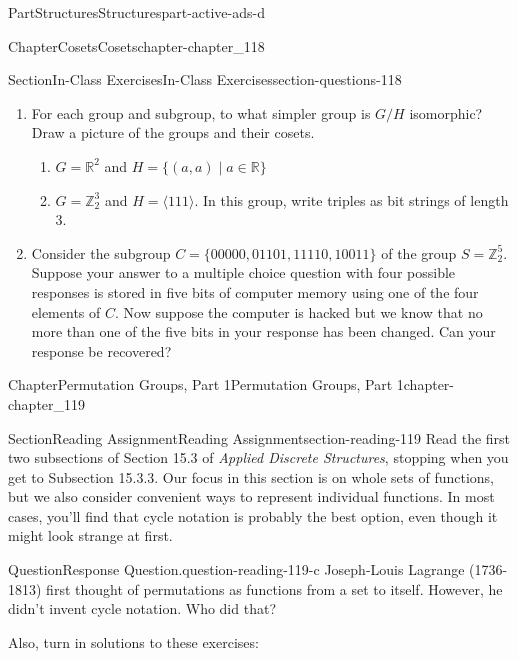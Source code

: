 \documentclass[oneside,10pt,]{book}
\numberwithin{equation}{section}
\begin{document}
\begin{partptx}{Part}{Structures}{}{Structures}{}{}{part-active-ads-d}
\begin{chapterptx}{Chapter}{Cosets}{}{Cosets}{}{}{chapter-chapter_118}
\begin{sectionptx}{Section}{In-Class Exercises}{}{In-Class Exercises}{}{}{section-questions-118}
\begin{enumerate}[label=\arabic*.]
\item{}For each group and subgroup, to what simpler group is  \(G/H\) isomorphic?  Draw a picture of the groups and their cosets.%
\begin{enumerate}[label=(\alph*)]
\item{}\(G= \mathbb{R}^2\)  and  \(H = \{(a,a) \mid a\in\mathbb{R}\}\)%
\item{}\(G = \mathbb{Z}_2^3\)  and  \(H = \langle 111 \rangle\).  In this group, write triples as bit strings of length 3.%
\end{enumerate}
%
\item{}Consider the subgroup \(C = \{00000, 01101, 11110, 10011\}\) of the group \(S=\mathbb{Z}_2^5\). Suppose your answer to a multiple choice question with four possible responses is stored in five bits of computer memory using one of the four elements of  \(C\).  Now suppose the computer is hacked but we know that no more than one of the five bits in your response has been changed.  Can your response be recovered?%
\end{enumerate}
%
\end{sectionptx}
\end{chapterptx}
%
\typeout{************************************************}
\typeout{************************************************}
%
\begin{chapterptx}{Chapter}{Permutation Groups, Part 1}{}{Permutation Groups, Part 1}{}{}{chapter-chapter_119}
\renewcommand*{\chaptername}{Chapter}
\index{}%
%
%
\typeout{************************************************}
\typeout{************************************************}
%
\begin{sectionptx}{Section}{Reading Assignment}{}{Reading Assignment}{}{}{section-reading-119}
Read the first two subsections of Section 15.3 of \emph{Applied Discrete Structures}, stopping when you get to  Subsection 15.3.3. Our focus in this section is on whole sets of functions, but we also consider convenient ways to represent individual functions.  In most cases, you'll find that cycle notation is probably the best option, even though it might look strange at first.%
\begin{question}{Question}{Response Question.}{question-reading-119-c}%
Joseph-Louis Lagrange (1736-1813) first thought of permutations as functions from a set to itself. However, he didn't invent cycle notation.  Who did that?%
\end{question}
Also, turn in solutions to these exercises:%

\end{sectionptx}
\end{chapterptx}
\end{partptx}
\end{document}
